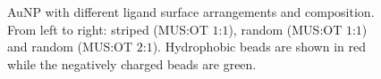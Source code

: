 \begin{figure}[!ht]
	\centering
	\qquad
	\qquad
	\caption{Au\acs{NP} with different ligand surface arrangements and composition. From left to right: striped (\ac{MUS}:\ac{OT} $1$:$1$), random (\ac{MUS}:\ac{OT} $1$:$1$) and random (\ac{MUS}:\ac{OT} $2$:$1$). Hydrophobic beads are shown in red while the negatively charged beads are green.}
	\label{fig:coating}
\end{figure}

